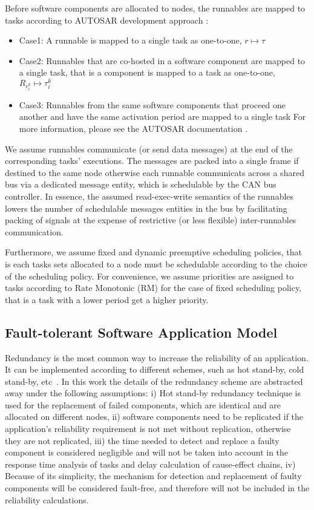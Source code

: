 Before software components are allocated to nodes, the runnables are mapped to tasks according to AUTOSAR development approach \cite{AUTOSAR2017SpecificationSoftware}:
\begin{itemize}
\item Case1: A runnable is mapped to a single task as one-to-one, $r\mapsto \tau$
\item Case2: Runnables that are co-hosted in a software component are mapped to a single task, that is a component is mapped to a task as one-to-one, $R_{c_i^k}\mapsto \tau_i^k$
\item Case3: Runnables from the same software components that proceed one another and have the same activation period are mapped to a single task
For more information, please see the AUTOSAR documentation \cite{AUTOSAR2017SpecificationSoftware}.
\end{itemize}

We assume runnables communicate (or send data messages) at the end of the corresponding tasks' executions. The messages are packed into a single frame if destined to the same node otherwise each runnable communicats across a shared bus via a dedicated message entity, which is schedulable by the CAN bus controller. In essence, the assumed read-exec-write semantics of the runnables lowers the number of schedulable messages entities in the bus by facilitating packing of signals at the expense of restrictive (or less flexible) inter-runnables communication.

Furthermore, we assume fixed and dynamic preemptive scheduling policies, that is each tasks sets allocated to a node must be schedulable according to the choice of the scheduling policy. For convenience, we assume priorities are assigned to tasks according to Rate Monotonic (RM) for the case of fixed scheduling policy, that is a task with a lower period get a higher priority.

\subsection{Fault-tolerant Software Application Model}
Redundancy is the most common way to increase the reliability of an application. It can be implemented according to different schemes, such as hot stand-by, cold stand-by, etc~\cite{Dubrova2013Fault-tolerantDesign}. In this work the details of the redundancy scheme are abstracted away under the following assumptions: i) Hot stand-by redundancy technique is used for the replacement of failed components, which are identical and are allocated on different nodes, ii) software components need to be replicated if the application's reliability requirement is not met without replication, otherwise they are not replicated, iii) the time needed to detect and replace a faulty component is considered negligible and will not be taken into account in the response time analysis of tasks and delay calculation of cause-effect chains, iv) Because of its simplicity, the mechanism for detection and replacement of faulty components will be considered fault-free, and therefore will not be included in the reliability calculations.

